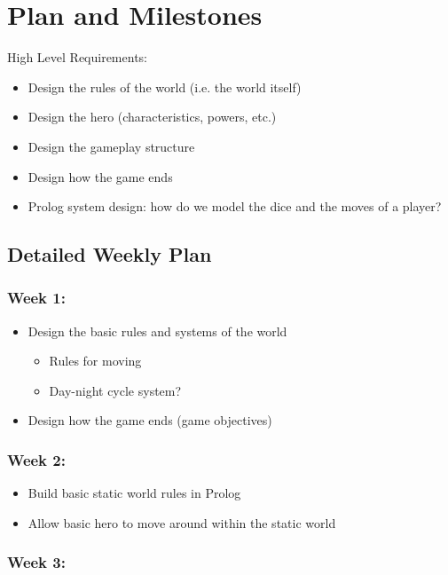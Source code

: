 \documentclass[10pt]{article}
\begin{document}
\section*{Plan and Milestones}

High Level Requirements:

\begin{itemize}
\item Design the rules of the world (i.e. the world itself)
\item Design the hero (characteristics, powers, etc.)
\item Design the gameplay structure
\item Design how the game ends
\item Prolog system design: how do we model the dice and the moves of a player?
\end{itemize}

\subsection*{Detailed Weekly Plan}

\subsubsection*{Week 1:}

\begin{itemize}
\item Design the basic rules and systems of the world
    \begin{itemize}
    \item Rules for moving
    \item Day-night cycle system?
    \end{itemize}
\item Design how the game ends (game objectives)
\end{itemize}


\subsubsection*{Week 2:}

\begin{itemize}
\item Build basic static world rules in Prolog
\item Allow basic hero to move around within the static world
\end{itemize}


\subsubsection*{Week 3:}
\end{document}
